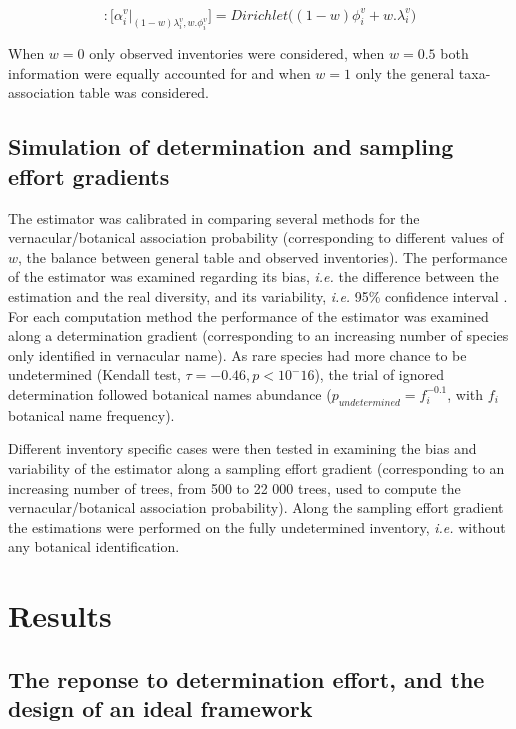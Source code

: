 \documentclass[fleqn,10pt]{ArtEcoFoG} %
\begin{document}
\begin{equation}
[\alpha_i^v]: 
\Big[\alpha_i^v | _{(1-w)\lambda_i^v ,w.\phi_i^v}\Big] =Dirichlet\Big((1-w)\phi_i^v+w.\lambda_i^v\Big)
\label{eq:weighting}
\end{equation}

When \(w=0\) only observed inventories were considered, when \(w=0.5\)
both information were equally accounted for and when \(w=1\) only the
general taxa-association table was considered.

\subsection{Simulation of determination and sampling effort
gradients}\label{simulation-of-determination-and-sampling-effort-gradients}

The estimator was calibrated in comparing several methods for the
vernacular/botanical association probability (corresponding to different
values of \(w\), the balance between general table and observed
inventories). The performance of the estimator was examined regarding
its bias, \emph{i.e.} the difference between the estimation and the real
diversity, and its variability, \emph{i.e.} 95\% confidence interval
\citep{Baltanas2009}. For each computation method the performance of the
estimator was examined along a determination gradient (corresponding to
an increasing number of species only identified in vernacular name). As
rare species had more chance to be undetermined (Kendall test,
\(\tau = -0.46, p < 10^-16\)), the trial of ignored determination
followed botanical names abundance (\(p_{undetermined}=f_i^{-0.1}\),
with \(f_i\) botanical name frequency).

Different inventory specific cases were then tested in examining the
bias and variability of the estimator along a sampling effort gradient
(corresponding to an increasing number of trees, from 500 to 22 000
trees, used to compute the vernacular/botanical association
probability). Along the sampling effort gradient the estimations were
performed on the fully undetermined inventory, \emph{i.e.} without any
botanical identification.

\section{Results}\label{results}

\subsection{The reponse to determination effort, and the design of an
ideal
framework}\label{the-reponse-to-determination-effort-and-the-design-of-an-ideal-framework}
\end{document}

